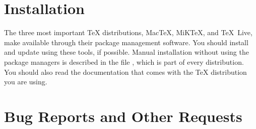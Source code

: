 \section{Installation}

The three most important \TeX{} distributions, Mac\TeX, MiK\TeX, and
\TeX{}~Live, make {\KOMAScript} available through their package management
software. You should install and update {\KOMAScript} using these tools, if
possible. Manual installation without using the package managers is described
in the file , which is part of every {\KOMAScript}
distribution. You should also read the documentation that comes with the
{\TeX} distribution you are using.


\section{Bug Reports and Other Requests}

